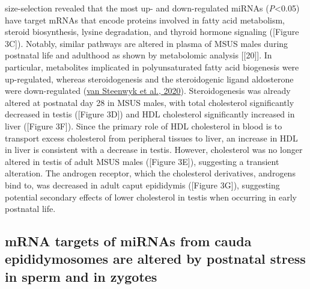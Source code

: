\documentclass[12pt,twoside]{reedthesis}
\begin{document}
size-selection revealed that the most up- and down-regulated miRNAs
(\emph{P}\textless0.05) have target mRNAs that encode proteins involved in fatty
acid metabolism, steroid biosynthesis, lysine degradation, and thyroid
hormone signaling ({[}Figure 3C{]}). Notably, similar pathways are altered
in plasma of MSUS males during postnatal life and adulthood as shown by
metabolomic analysis {[}{[}20{]}{]}. In particular, metabolites implicated in
polyunsaturated fatty acid biogenesis were up-regulated, whereas
steroidogenesis and the steroidogenic ligand aldosterone were
down-regulated (\protect\hyperlink{ref-vansteenwyk2020}{van Steenwyk et al., 2020}). Steroidogenesis was already altered
at postnatal day 28 in MSUS males, with total cholesterol significantly
decreased in testis ({[}Figure 3D{]}) and HDL cholesterol significantly
increased in liver ({[}Figure 3F{]}). Since the primary role of HDL
cholesterol in blood is to transport excess cholesterol from peripheral
tissues to liver, an increase in HDL in liver is consistent with a
decrease in testis. However, cholesterol was no longer altered in testis
of adult MSUS males ({[}Figure 3E{]}), suggesting a transient alteration.
The androgen receptor, which the cholesterol derivatives, androgens bind
to, was decreased in adult caput epididymis ({[}Figure 3G{]}), suggesting
potential secondary effects of lower cholesterol in testis when
occurring in early postnatal life.

\hypertarget{mrna-targets-of-mirnas-from-cauda-epididymosomes-are-altered-by-postnatal-stress-in-sperm-and-in-zygotes}{%
\subsection{mRNA targets of miRNAs from cauda epididymosomes are altered by postnatal stress in sperm and in zygotes}\label{mrna-targets-of-mirnas-from-cauda-epididymosomes-are-altered-by-postnatal-stress-in-sperm-and-in-zygotes}}
\end{document}
